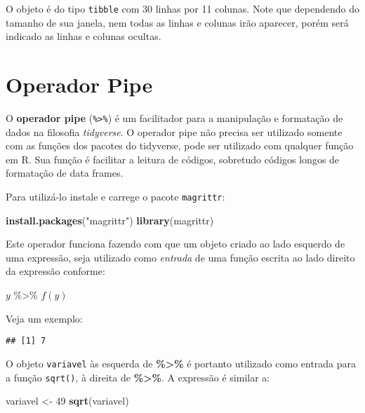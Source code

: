 \documentclass[
]{book}
\newenvironment{Shaded}{\begin{snugshade}}{\end{snugshade}}
\newcommand{\DecValTok}[1]{\textcolor[rgb]{0.00,0.00,0.81}{#1}}
\newcommand{\KeywordTok}[1]{\textcolor[rgb]{0.13,0.29,0.53}{\textbf{#1}}}
\newcommand{\NormalTok}[1]{#1}
\newcommand{\OperatorTok}[1]{\textcolor[rgb]{0.81,0.36,0.00}{\textbf{#1}}}
\newcommand{\StringTok}[1]{\textcolor[rgb]{0.31,0.60,0.02}{#1}}
\begin{document}
O objeto é do tipo \texttt{tibble} com 30 linhas por 11 colunas. Note que dependendo do tamanho de sua janela, nem todas as linhas e colunas irão aparecer, porém será indicado as linhas e colunas ocultas.

\hypertarget{pipe}{%
\chapter{Operador Pipe}\label{pipe}}

O \textbf{operador pipe} (\texttt{\%\textgreater{}\%}) é um facilitador para a manipulação e formatação de dados na filosofia \emph{tidyverse}. O operador pipe não precisa ser utilizado somente com as funções dos pacotes do tidyverse, pode ser utilizado com qualquer função em R. Sua função é facilitar a leitura de códigos, sobretudo códigos longos de formatação de data frames.

Para utilizá-lo instale e carrege o pacote \texttt{magrittr}:

\begin{Shaded}
\begin{Highlighting}[]
\KeywordTok{install.packages}\NormalTok{(}\StringTok{"magrittr"}\NormalTok{)}
\KeywordTok{library}\NormalTok{(magrittr)}
\end{Highlighting}
\end{Shaded}

Este operador funciona fazendo com que um objeto criado ao lado esquerdo de uma expressão, seja utilizado como \emph{entrada} de uma função escrita ao lado direito da expressão conforme:

\(y\) \%\textgreater\% \(f(y)\)

Veja um exemplo:

\begin{Shaded}
\end{Shaded}

\begin{verbatim}
## [1] 7
\end{verbatim}

O objeto \texttt{variavel} às esquerda de \textbf{\%\textgreater\%} é portanto utilizado como entrada para a função \texttt{sqrt()}, à direita de \textbf{\%\textgreater\%}. A expressão é similar a:

\begin{Shaded}
\begin{Highlighting}[]
\NormalTok{variavel <-}\StringTok{ }\DecValTok{49}
\KeywordTok{sqrt}\NormalTok{(variavel)}
\end{Highlighting}
\end{Shaded}
\end{document}
